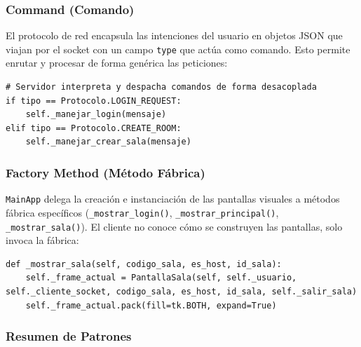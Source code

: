 \documentclass[12pt,a4paper]{article}
\begin{document}
\subsubsection{Command (Comando)}
El protocolo de red encapsula las intenciones del usuario en objetos JSON que viajan por el socket con un campo \texttt{type} que act\'ua como comando. Esto permite enrutar y procesar de forma gen\'erica las peticiones:

\begin{lstlisting}
# Servidor interpreta y despacha comandos de forma desacoplada
if tipo == Protocolo.LOGIN_REQUEST:
    self._manejar_login(mensaje)
elif tipo == Protocolo.CREATE_ROOM:
    self._manejar_crear_sala(mensaje)
\end{lstlisting}

\subsubsection{Factory Method (M\'etodo F\'abrica)}
\texttt{MainApp} delega la creaci\'on e instanciaci\'on de las pantallas visuales a m\'etodos f\'abrica espec\'ificos (\texttt{\_mostrar\_login()}, \texttt{\_mostrar\_principal()}, \texttt{\_mostrar\_sala()}). El cliente no conoce c\'omo se construyen las pantallas, solo invoca la f\'abrica:

\begin{lstlisting}
def _mostrar_sala(self, codigo_sala, es_host, id_sala):
    self._frame_actual = PantallaSala(self, self._usuario, self._cliente_socket, codigo_sala, es_host, id_sala, self._salir_sala)
    self._frame_actual.pack(fill=tk.BOTH, expand=True)
\end{lstlisting}

\subsubsection{Resumen de Patrones}
\end{document}
